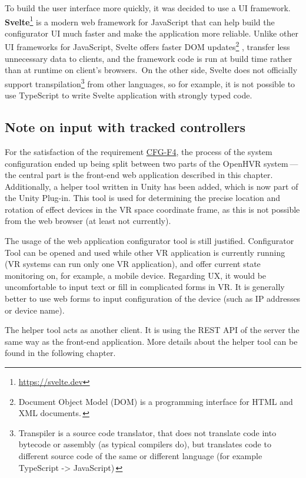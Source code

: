 To build the user interface more quickly, it was decided to use a UI framework.
\textbf{Svelte}\footnote{\href{https://svelte.dev}{https://svelte.dev}} is a modern web framework for JavaScript
that can help build the configurator UI much faster and make the application
more reliable. Unlike other UI frameworks for JavaScript, Svelte offers
faster DOM updates\footnote{Document Object Model (DOM) is a programming interface for HTML and XML documents.\,\cite{dom}}
, transfer less unnecessary data to clients, and the framework code is run 
at build time rather than at runtime on client’s browsers.\,\cite{svelteblog} 
On the other side, Svelte does not officially
support transpilation\footnote{Transpiler is a source code translator, that does 
not translate code into bytecode or assembly (as typical compilers do), but 
translates code to different source code of the same or different language 
(for example TypeScript -> JavaScript)\,\cite{sscd}}
from other languages, so for example, it is not possible
to use TypeScript to write Svelte application with strongly typed code.


\subsection{Note on input with tracked controllers}
For the satisfaction of the requirement \hyperref[cfg-f4]{CFG-F4}, the process of the system configuration
ended up being split between two parts of the OpenHVR system — the central part is the front-end web application described
in this chapter. Additionally, a helper tool written in Unity has been added,
which is now part of the Unity Plug-in. This tool is used for determining
the precise location and rotation of effect devices in the VR space
coordinate frame, as this is not possible from the web browser (at least
not currently).


The usage of the web application configurator tool is still justified.
Configurator Tool can be opened and used while other VR application is currently
running (VR systems can run only one VR application), and offer current state
monitoring on, for example, a mobile device. Regarding UX, it would be uncomfortable to
input text or fill in complicated forms in VR. It is generally better to use web forms to
input configuration of the device (such as IP addresses or device name).


The helper tool acts as another client. It is using the REST API of the server
the same way as the front-end application. More details about the helper tool
can be found in the following chapter.


